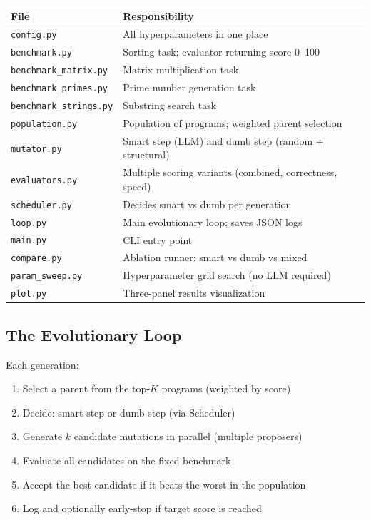 \documentclass[11pt,a4paper]{article}
\begin{document}
\begin{center}
\begin{tabular}{lp{9cm}}
\toprule
\textbf{File} & \textbf{Responsibility} \\
\midrule
\texttt{config.py}          & All hyperparameters in one place \\
\texttt{benchmark.py}        & Sorting task; evaluator returning score 0--100 \\
\texttt{benchmark\_matrix.py} & Matrix multiplication task \\
\texttt{benchmark\_primes.py} & Prime number generation task \\
\texttt{benchmark\_strings.py} & Substring search task \\
\texttt{population.py}      & Population of programs; weighted parent selection \\
\texttt{mutator.py}         & Smart step (LLM) and dumb step (random + structural) \\
\texttt{evaluators.py}      & Multiple scoring variants (combined, correctness, speed) \\
\texttt{scheduler.py}       & Decides smart vs dumb per generation \\
\texttt{loop.py}            & Main evolutionary loop; saves JSON logs \\
\texttt{main.py}            & CLI entry point \\
\texttt{compare.py}         & Ablation runner: smart vs dumb vs mixed \\
\texttt{param\_sweep.py}    & Hyperparameter grid search (no LLM required) \\
\texttt{plot.py}            & Three-panel results visualization \\
\bottomrule
\end{tabular}
\end{center}

\subsection{The Evolutionary Loop}

Each generation:
\begin{enumerate}
  \item Select a parent from the top-$K$ programs (weighted by score)
  \item Decide: smart step or dumb step (via Scheduler)
  \item Generate $k$ candidate mutations in parallel (multiple proposers)
  \item Evaluate all candidates on the fixed benchmark
  \item Accept the best candidate if it beats the worst in the population
  \item Log and optionally early-stop if target score is reached
\end{enumerate}
\end{document}
